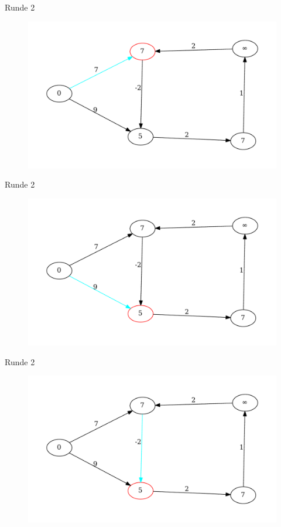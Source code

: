 \begin{frame}{Runde 2}
\begin{figure}[htbp]
\centering
\includegraphics[width=\linewidth]{bellman_ford_graphs/graph_08.pdf}
\end{figure}
\end{frame}

\begin{frame}{Runde 2}
\begin{figure}[htbp]
\centering
\includegraphics[width=\linewidth]{bellman_ford_graphs/graph_09.pdf}
\end{figure}
\end{frame}

\begin{frame}{Runde 2}
\begin{figure}[htbp]
\centering
\includegraphics[width=\linewidth]{bellman_ford_graphs/graph_10.pdf}
\end{figure}
\end{frame}

